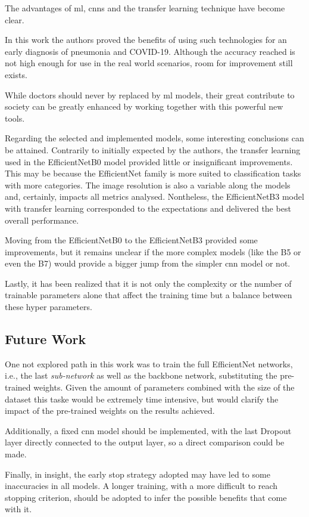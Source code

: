 \documentclass[conference]{IEEEtran}
\begin{document}
The advantages of \gls{ml}, \glspl{cnn} and the transfer learning technique have become clear. 

In this work the authors proved the benefits of using such technologies for an early diagnosis of pneumonia and COVID-19. Although the accuracy reached is not high enough for use in the real world scenarios, room for improvement still exists. 

While doctors should never by replaced by \gls{ml} models, their great contribute to society can be greatly enhanced by working together with this powerful new tools.

Regarding the selected and implemented models, some interesting conclusions can be attained. Contrarily to initially expected by the authors, the transfer learning used in the EfficientNetB0 model provided little or insignificant improvements. This may be because the EfficientNet family is more suited to classification tasks with more categories. The image resolution is also a variable along the models and, certainly, impacts all metrics analysed. Nontheless, the EfficientNetB3 model with transfer learning corresponded to the expectations and delivered the best overall performance.

Moving from the EfficientNetB0 to the EfficientNetB3 provided some improvements, but it remains unclear if the more complex models (like the B5 or even the B7) would provide a bigger jump from the simpler \gls{cnn} model or not.

Lastly, it has been realized that it is not only the complexity or the number of trainable parameters alone that affect the training time but a balance between these hyper parameters.


\subsection{Future Work}

One not explored path in this work was to train the full EfficientNet networks, i.e., the last \textit{sub-network} as well as the backbone network, substituting the pre-trained weights. Given the amount of parameters combined with the size of the dataset this taske would be extremely time intensive, but would clarify the impact of the pre-trained weights on the results achieved.

Additionally, a fixed \gls{cnn} model should be implemented, with the last Dropout layer directly connected to the output layer, so a direct comparison could be made.

Finally, in insight, the early stop strategy adopted may have led to some inaccuracies in all models. A longer training, with a more difficult to reach stopping criterion, should be adopted to infer the possible benefits that come with it.

\FloatBarrier
\printbibliography
\end{document}
